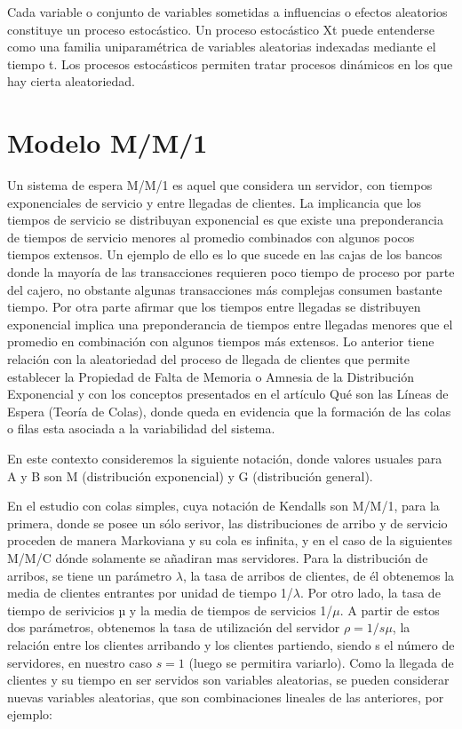 Cada variable o conjunto de variables sometidas a influencias o efectos aleatorios constituye un proceso estocástico.
Un proceso estocástico Xt puede entenderse como una familia uniparamétrica de
variables aleatorias indexadas mediante el tiempo t.
Los procesos estocásticos permiten tratar procesos dinámicos en los que hay cierta aleatoriedad.


\section{Modelo M/M/1}\label{sec:modelo-m/m/1}
Un sistema de espera M/M/1 es aquel que considera un servidor, con tiempos exponenciales de servicio y entre llegadas
de clientes. La implicancia que los tiempos de servicio se distribuyan exponencial es que existe una preponderancia de
tiempos de servicio menores al promedio combinados con algunos pocos tiempos extensos. Un ejemplo de ello es lo que
sucede en las cajas de los bancos donde la mayoría de las transacciones requieren poco tiempo de proceso por parte del
cajero, no obstante algunas transacciones más complejas consumen bastante tiempo. Por otra parte afirmar que los tiempos
entre llegadas se distribuyen exponencial implica una preponderancia de tiempos entre llegadas menores que el promedio
en combinación con algunos tiempos más extensos. Lo anterior tiene relación con la aleatoriedad del proceso de llegada
de clientes que permite establecer la Propiedad de Falta de Memoria o Amnesia de la Distribución Exponencial y
con los conceptos presentados en el artículo Qué son las Líneas de Espera (Teoría de Colas), donde queda en evidencia
que la formación de las colas o filas esta asociada a la variabilidad del sistema.

En este contexto consideremos la siguiente notación, donde valores usuales para A y B son M (distribución exponencial)
y G (distribución general).

En el estudio con colas simples, cuya notación de Kendalls son M/M/1, para la primera, donde se posee un sólo serivor,
las distribuciones de arribo y de servicio proceden de manera Markoviana y su cola es infinita, y en el caso de la
siguientes M/M/C dónde solamente se añadiran mas servidores.
Para la distribución de arribos, se tiene un parámetro $\lambda$, la tasa de arribos de clientes, de él obtenemos la media de
clientes entrantes por unidad de tiempo 1/$\lambda$.
Por otro lado, la tasa de tiempo de serivicios µ y la media de tiempos de servicios 1/$\mu$.
A partir de estos dos parámetros, obtenemos la tasa de utilización del servidor $\rho = 1/s\mu$, la relación entre los clientes
arribando y los clientes partiendo, siendo s el número de servidores, en nuestro caso $s = 1$ (luego se permitira variarlo).
Como la llegada de clientes y su tiempo en ser servidos son variables aleatorias, se pueden considerar
nuevas variables aleatorias, que son combinaciones lineales de las anteriores, por ejemplo:

